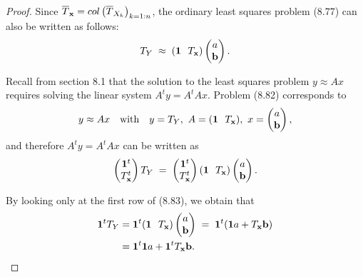 \begin{proof}
Since $\overline{T}_{\mathbf{x}} = col\left(\overline{T}_{X_k}\right)_{k=1:n}$, the ordinary
least squares problem (8.77) can also be written as follows:
\begin{equation}
T_Y \;\approx\; (\bfone\ \ T_{\bfx})\begin{pmatrix} a \\ \bfb \end{pmatrix}.
\end{equation}

Recall from section 8.1 that the solution to the least squares problem $y\approx Ax$
requires solving the linear system $A^ty = A^tAx$. Problem (8.82) corresponds to
\[
y \approx Ax \quad \text{with} \quad y = T_Y,\ A = (\mathbf{1}\ \ T_{\mathbf{x}}),\ x =
\begin{pmatrix} a \\ \mathbf{b} \end{pmatrix},
\]
and therefore $A^ty = A^tAx$ can be written as
\begin{equation}
\begin{pmatrix} \mathbf{1}^t \\ T_{\mathbf{x}}^t \end{pmatrix}T_Y \;=\; \begin{pmatrix} \mathbf{1}^t \\
T_{\mathbf{x}}^t \end{pmatrix}(\mathbf{1}\ \ T_{\mathbf{x}})\begin{pmatrix} a \\ \mathbf{b} \end{pmatrix}.
\end{equation}

By looking only at the first row of (8.83), we obtain that
\begin{align}
\mathbf{1}^tT_Y &= \mathbf{1}^t(\mathbf{1}\ \ T_{\mathbf{x}})\begin{pmatrix} a \\ \mathbf{b} \end{pmatrix} \;=\;
\mathbf{1}^t(\mathbf{1} a + T_{\mathbf{x}}\mathbf{b}) \notag\\
&= \mathbf{1}^t\mathbf{1} a + \mathbf{1}^tT_{\mathbf{x}}\mathbf{b}.
\end{align}


\end{proof}

